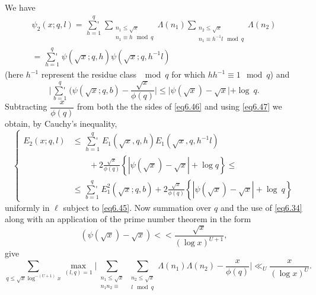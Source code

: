 We have
\begin{gather*}
\psi_2 (x; q, l) = \mathop{\sum{}'}\limits_{h=1}^{q} \sum_{\substack {n_1 \leq
    \sqrt{x}\\{n_1 \equiv h \mod q}}} \Lambda (n_1)
\sum_{\substack {n_2  \leq \sqrt{x}\\{n_1 \equiv h^{-1} l \mod q}}}
\Lambda (n_2)\\ 
= \mathop{\sum{}'}\limits^{q}_{h=1} \psi (\sqrt{x}; q, h)\psi
(\sqrt{x};q,h^{-1} l)  \tag{6.46}\label{eq6.46}  
\end{gather*} 
(here $h^{-1}$ represent the residue class $\mod q$ for which
$hh^{-1}\equiv 1 \mod q$) and  
\begin{equation*}
\Big|\mathop{\sum{}'}\limits_{b=1}^{q}(\psi(\sqrt{x};q,b) - \frac
            {\sqrt{x}}{\phi(q)}  \Big|\leq \Big|\psi
            (\sqrt{x})-\sqrt{x}|+ \log ~
            q. \tag{6.47}\label{eq6.47}   
\end{equation*} 
Subtracting $\dfrac{x}{\phi(q)}$ from both the the sides of \eqref{eq6.46}
and using \eqref{eq6.47} we obtain, by Cauchy's inequality, 
\begin{equation*}
\begin{cases}
E_2 (x;q,l) & \leq \mathop{\sum{}'}\limits^{q}_{h=1} E_1 (\sqrt{x},q,h) E_1
(\sqrt{x},q,h^{-1}l)\\
& \qquad +2 \frac{\sqrt{x}}{\phi(q)}\left \{ |\psi
(\sqrt{x})-\sqrt{x}|+\log q \right\} \leq \\  
& \leq \mathop{\sum{}'}\limits^{q}_{b=1} E^2_1 (\sqrt{x};q,b) + 2
\frac{\sqrt{x}}{\phi (q)}  
\left\{ |\psi (\sqrt{x})-\sqrt{x}| + \log ~ q \right\}  
\end{cases}\tag{6.48}\label{eq6.48} 
\end{equation*}  
uniformly in $\ell$ subject to \eqref{eq6.45}. Now summation over $q$
and the use of \eqref{eq6.34} along with an application of the prime number
theorem in the form 
\begin{equation*}
(\psi (\sqrt{x})-\sqrt{x})<< \frac{\sqrt{x}}{(\log x)^{U+1}},
  \tag{6.49}\label{eq6.49}  
\end{equation*} 
give
\begin{equation*}
\sum_{q \leq \sqrt{x}\log^{-(U+1)}x} \underset{(l,q)=1} \max \Big|\sum
_{\substack {n_1 \leq \sqrt{x}\\ {n_1 n_2 \equiv }}}\sum_{\substack {n_2
    \leq \sqrt{x}\\ {l \mod q}}} \Lambda (n_1)\Lambda (n_2) -
\frac{x}{\phi (q)}\Big| \ll_U \frac{x}{(\log x
  )^U}. \tag{6.50}\label{eq6.50}  
\end{equation*}  

